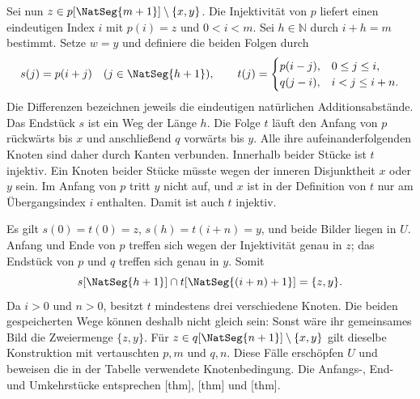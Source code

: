 \documentclass[main.tex]{subfiles}
\begin{document}
Sei nun \(z\in p[\NatSeg{m+1}]\setminus\{x,y\}\). Die Injektivität
von \(p\) liefert einen eindeutigen Index \(i\) mit \(p(i)=z\) und
\(0<i<m\). Sei \(h\in\mathbb N\) durch \(i+h=m\) bestimmt. Setze
\(w=y\) und definiere die beiden Folgen durch
\[
  s(j)=p(i+j)\quad(j\in\NatSeg{h+1}),\qquad
  t(j)=
  \begin{cases}
    p(i-j),&0\leq j\leq i,\\
    q(j-i),&i<j\leq i+n.
  \end{cases}
\]
Die Differenzen bezeichnen jeweils die eindeutigen natürlichen
Additionsabstände. Das Endstück \(s\) ist ein Weg der Länge \(h\).
Die Folge \(t\) läuft den Anfang von \(p\) rückwärts bis \(x\) und
anschließend \(q\) vorwärts bis \(y\). Alle ihre aufeinanderfolgenden
Knoten sind daher durch Kanten verbunden. Innerhalb beider Stücke ist
\(t\) injektiv. Ein Knoten beider Stücke müsste wegen der inneren
Disjunktheit \(x\) oder \(y\) sein. Im Anfang von \(p\) tritt \(y\)
nicht auf, und \(x\) ist in der Definition von \(t\) nur am
Übergangsindex \(i\) enthalten. Damit ist auch \(t\) injektiv.

Es gilt \(s(0)=t(0)=z\), \(s(h)=t(i+n)=y\), und beide Bilder liegen
in \(U\). Anfang und Ende von \(p\) treffen sich wegen der
Injektivität genau in \(z\); das Endstück von \(p\) und \(q\)
treffen sich genau in \(y\). Somit
\[
  s[\NatSeg{h+1}]\cap t[\NatSeg{(i+n)+1}]=\{z,y\}.
\]
Da \(i>0\) und \(n>0\), besitzt \(t\) mindestens drei verschiedene
Knoten. Die beiden gespeicherten Wege können deshalb nicht gleich
sein: Sonst wäre ihr gemeinsames Bild die Zweiermenge \(\{z,y\}\).
Für \(z\in q[\NatSeg{n+1}]\setminus\{x,y\}\) gilt dieselbe
Konstruktion mit vertauschten \(p,m\) und \(q,n\). Diese Fälle
erschöpfen \(U\) und beweisen die in der Tabelle verwendete
Knotenbedingung. Die Anfangs-, End- und Umkehrstücke entsprechen
[thm],
[thm] und
[thm].
\end{document}
